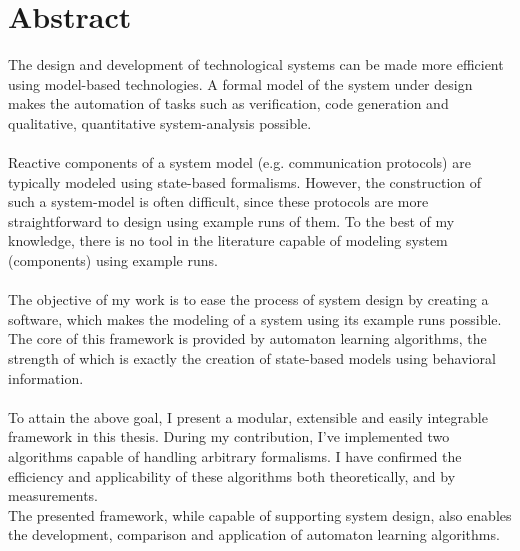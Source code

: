 \chapter*{Abstract}

The design and development of technological systems can be made more efficient using model-based technologies. A formal model of the system under design makes the automation of tasks such as verification, code generation and qualitative, quantitative system-analysis possible.
\\\\
Reactive components of a system model (e.g. communication protocols) are typically modeled using state-based formalisms. However, the construction of such a system-model is often difficult, since these protocols are more straightforward to design using example runs of them. To the best of my knowledge, there is no tool in the literature capable of modeling system (components) using example runs.
\\\\
The objective of my work is to ease the process of system design by creating a software, which makes the modeling of a system using its example runs possible. The core of this framework is provided by automaton learning algorithms, the strength of which is exactly the creation of state-based models using behavioral information.
\\\\
To attain the above goal, I present a modular, extensible and easily integrable framework in this thesis. During my contribution, I've implemented two algorithms capable of handling arbitrary formalisms. I have confirmed the efficiency and applicability of these algorithms both theoretically, and by measurements.
\\
The presented framework, while capable of supporting system design, also enables the development, comparison and application of automaton learning algorithms.



\vfill
\selectthesislanguage

\setcounter{romanPage}{\value{page}}
